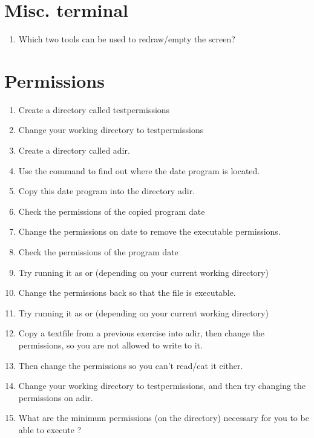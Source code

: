 \documentclass[letterpaper,10pt,english]{sphinxmanual}
\begin{document}
\section{Misc. terminal}
\label{exercises_beginner:misc-terminal}\begin{enumerate}
\item {} 
Which two tools can be used to redraw/empty the screen?

\end{enumerate}


\section{Permissions}
\label{exercises_beginner:permissions}\begin{enumerate}
\item {} 
Create a directory called testpermissions

\item {} 
Change your working directory to testpermissions

\item {} 
Create a directory called adir.

\item {} 
Use the command  to find out where the date program is located.

\item {} 
Copy this date program into the directory adir.

\item {} 
Check the permissions of the copied program date

\item {} 
Change the permissions on date to remove the executable permissions.

\item {} 
Check the permissions of the program date

\item {} 
Try running it as  or  (depending on your current working directory)

\item {} 
Change the permissions back so that the file is executable.

\item {} 
Try running it as  or  (depending on your current working directory)

\item {} 
Copy a textfile from a previous exercise into adir, then change the permissions, so you are not allowed to write to it.

\item {} 
Then change the permissions so you can't read/cat it either.

\item {} 
Change your working directory to testpermissions, and then try changing the permissions on adir.

\item {} 
What are the minimum permissions (on the directory) necessary for you to be able to execute ?

\end{enumerate}
\end{document}
